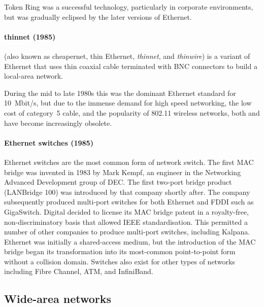 Token Ring was a successful technology, particularly in corporate environments, but was gradually eclipsed by the later versions of Ethernet.

\paragraph{thinnet (1985)}%
 (also known as cheapernet, thin Ethernet, \emph{thinnet}, and \emph{thinwire}) is a variant of Ethernet that uses thin coaxial cable terminated with \acs{BNC} connectors to build a local-area network.

During the mid to late 1980s this was the dominant Ethernet standard for 10~Mbit/s, %
but due to the immense demand for high speed networking, the low cost of category~5 cable, and the popularity of 802.11 wireless networks, both  and  have become increasingly obsolete.

\paragraph{Ethernet switches (1985)}%
Ethernet switches are the most common form of network switch.
The first \acs{MAC} bridge was invented in 1983 by Mark Kempf, an engineer in the Networking Advanced Development group of \gls{DEC}.
The first two-port bridge product (LANBridge 100) was introduced by that company shortly after.
The company subsequently produced multi-port switches for both Ethernet and \acs{FDDI} such as GigaSwitch.
Digital decided to license its \acs{MAC} bridge patent in a royalty-free, non-dis\-crim\-i\-na\-tory basis that allowed \acs{IEEE} standardisation.
This permitted a number of other companies to produce multi-port switches, including Kalpana.
Ethernet was initially a shared-access medium, but the introduction of the \acs{MAC} bridge began its transformation into its most-common point-to-point form without a collision domain.
Switches also exist for other types of networks including Fibre Channel, \gls{ATM}, and InfiniBand.
    
\subsection{Wide-area networks}
\label{sec:network-evoluation-wan}


